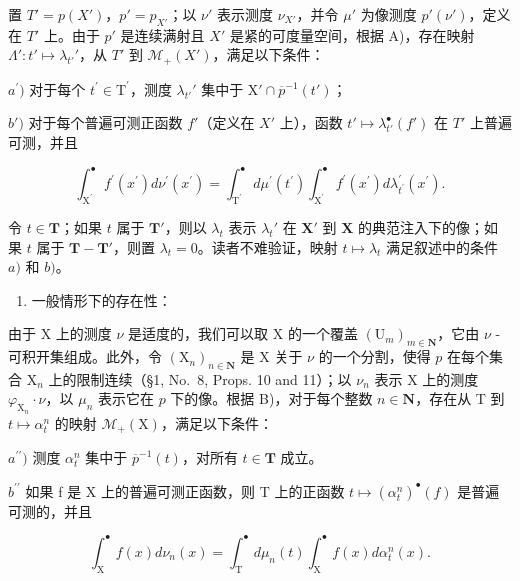 置 \(T' = p(X')\)，\(p' = p_{X'}\)；以 \(\nu'\) 表示测度 \(\nu_{X'}\)，并令 \(\mu'\) 为像测度 \(p'(\nu')\)，定义在 \(T'\) 上。由于 \(p'\) 是连续满射且 \(X'\) 是紧的可度量空间，根据 A)，存在映射 \(\Lambda': t' \mapsto \lambda_{t'}'\)，从 \(T'\) 到 \(\mathcal{M}_{+}(X')\)，满足以下条件：

\(a^{\prime})\) 对于每个 \(t^\prime \in \mathrm{T}^\prime\)，测度 \(\lambda_{t'}'\) 集中于 \(\mathrm{X}' \cap \overline{p}^{-1}(t')\)；

\(b')\) 对于每个普遍可测正函数 \(f'\)（定义在 \(X'\) 上），函数 \(t' \mapsto \lambda_{t'}^{\bullet}(f')\) 在 \(T'\) 上普遍可测，并且

\[
\int_ {\mathrm{X} ^ {\prime}} ^ {\bullet} f ^ {\prime} (x ^ {\prime}) d \nu^ {\prime} (x ^ {\prime}) = \int_ {\mathrm{T} ^ {\prime}} ^ {\bullet} d \mu^ {\prime} (t ^ {\prime}) \int_ {\mathrm{X} ^ {\prime}} ^ {\bullet} f ^ {\prime} (x ^ {\prime}) d \lambda_ {t ^ {\prime}} ^ {\prime} (x ^ {\prime}).
\]

令 \(t \in \mathbf{T}\)；如果 \(t\) 属于 \(\mathbf{T}'\)，则以 \(\lambda_t\) 表示 \(\lambda_t'\) 在 \(\mathbf{X}'\) 到 \(\mathbf{X}\) 的典范注入下的像；如果 \(t\) 属于 \(\mathbf{T} - \mathbf{T}'\)，则置 \(\lambda_t = 0\)。读者不难验证，映射 \(t \mapsto \lambda_t\) 满足叙述中的条件 \(a)\) 和 \(b)\)。

\begin{enumerate}
\def\labelenumi{\Alph{enumi})}
\setcounter{enumi}{2}
\tightlist
\item
  一般情形下的存在性：
\end{enumerate}

由于 X 上的测度 \(\nu\) 是适度的，我们可以取 X 的一个覆盖 \((\mathrm{U}_m)_{m\in \mathbf{N}}\)，它由 \(\nu\) -可积开集组成。此外，令 \((\mathrm{X}_n)_{n\in \mathbf{N}}\) 是 X 关于 \(\nu\) 的一个分割，使得 \(p\) 在每个集合 \(\mathrm{X}_n\) 上的限制连续（§1, No.~8, Props. 10 and 11）；以 \(\nu_n\) 表示 X 上的测度 \(\varphi_{\mathrm{X}_n}\cdot \nu\)，以 \(\mu_n\) 表示它在 \(p\) 下的像。根据 B)，对于每个整数 \(n\in \mathbf{N}\)，存在从 T 到 \(t\mapsto \alpha_t^n\) 的映射 \(\mathcal{M}_{+}(\mathrm{X})\)，满足以下条件：

\(a^{\prime \prime})\) 测度 \(\alpha_{t}^{n}\) 集中于 \(\overline{p}^{-1}(t)\)，对所有 \(t\in \mathbf{T}\) 成立。

\(b^{\prime\prime}\) 如果 f 是 X 上的普遍可测正函数，则 T 上的正函数 \(t \mapsto (\alpha_{t}^{n})^{\bullet}(f)\) 是普遍可测的，并且

\[
\int_ {\mathrm{X}} ^ {\bullet} f (x) d \nu_ {n} (x) = \int_ {\mathrm{T}} ^ {\bullet} d \mu_ {n} (t) \int_ {\mathrm{X}} ^ {\bullet} f (x) d \alpha_ {t} ^ {n} (x).\tag{13}
\]

